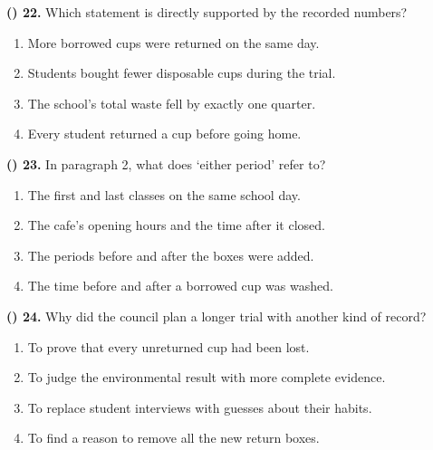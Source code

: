 \documentclass[11pt,a4paper]{article}
\newenvironment{qblock}{\par\vspace{3pt}\noindent\begin{minipage}{\linewidth}}{\end{minipage}\par\vspace{4pt}}
\begin{document}
\begin{qblock}
\textbf{(\hspace{0.6cm}) 22.} Which statement is directly supported by the recorded numbers?
\par
\begin{enumerate}[label=(\Alph*),leftmargin=1.0cm,nosep,topsep=2pt]
\item More borrowed cups were returned on the same day.
\item Students bought fewer disposable cups during the trial.
\item The school's total waste fell by exactly one quarter.
\item Every student returned a cup before going home.
\end{enumerate}
\end{qblock}
\begin{qblock}
\textbf{(\hspace{0.6cm}) 23.} In paragraph 2, what does `either period' refer to?
\par
\begin{enumerate}[label=(\Alph*),leftmargin=1.0cm,nosep,topsep=2pt]
\item The first and last classes on the same school day.
\item The cafe's opening hours and the time after it closed.
\item The periods before and after the boxes were added.
\item The time before and after a borrowed cup was washed.
\end{enumerate}
\end{qblock}
\begin{qblock}
\textbf{(\hspace{0.6cm}) 24.} Why did the council plan a longer trial with another kind of record?
\par
\begin{enumerate}[label=(\Alph*),leftmargin=1.0cm,nosep,topsep=2pt]
\item To prove that every unreturned cup had been lost.
\item To judge the environmental result with more complete evidence.
\item To replace student interviews with guesses about their habits.
\item To find a reason to remove all the new return boxes.
\end{enumerate}
\end{qblock}

\newpage
\end{document}
